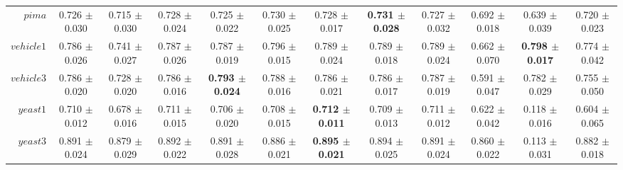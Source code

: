 \begin{table}[!ht]
{\begin{tabular}{r c c c c c c c c c c c}
$pima$ & 0.726 $\pm$ 0.030 & 0.715 $\pm$ 0.030 & 0.728 $\pm$ 0.024 & 0.725 $\pm$ 0.022 & 0.730 $\pm$ 0.025 & 0.728 $\pm$ 0.017 & \textbf{0.731 $\pm$ 0.028} & 0.727 $\pm$ 0.032 & 0.692 $\pm$ 0.018 & 0.639 $\pm$ 0.039 & 0.720 $\pm$ 0.023 \\
$vehicle1$ & 0.786 $\pm$ 0.026 & 0.741 $\pm$ 0.027 & 0.787 $\pm$ 0.026 & 0.787 $\pm$ 0.019 & 0.796 $\pm$ 0.015 & 0.789 $\pm$ 0.024 & 0.789 $\pm$ 0.018 & 0.789 $\pm$ 0.024 & 0.662 $\pm$ 0.070 & \textbf{0.798 $\pm$ 0.017} & 0.774 $\pm$ 0.042 \\
$vehicle3$ & 0.786 $\pm$ 0.020 & 0.728 $\pm$ 0.020 & 0.786 $\pm$ 0.016 & \textbf{0.793 $\pm$ 0.024} & 0.788 $\pm$ 0.016 & 0.786 $\pm$ 0.021 & 0.786 $\pm$ 0.017 & 0.787 $\pm$ 0.019 & 0.591 $\pm$ 0.047 & 0.782 $\pm$ 0.029 & 0.755 $\pm$ 0.050 \\
$yeast1$ & 0.710 $\pm$ 0.012 & 0.678 $\pm$ 0.016 & 0.711 $\pm$ 0.015 & 0.706 $\pm$ 0.020 & 0.708 $\pm$ 0.015 & \textbf{0.712 $\pm$ 0.011} & 0.709 $\pm$ 0.013 & 0.711 $\pm$ 0.012 & 0.622 $\pm$ 0.042 & 0.118 $\pm$ 0.016 & 0.604 $\pm$ 0.065 \\
$yeast3$ & 0.891 $\pm$ 0.024 & 0.879 $\pm$ 0.029 & 0.892 $\pm$ 0.022 & 0.891 $\pm$ 0.028 & 0.886 $\pm$ 0.021 & \textbf{0.895 $\pm$ 0.021} & 0.894 $\pm$ 0.025 & 0.891 $\pm$ 0.024 & 0.860 $\pm$ 0.022 & 0.113 $\pm$ 0.031 & 0.882 $\pm$ 0.018 \\
\end{tabular}}
\end{table}
